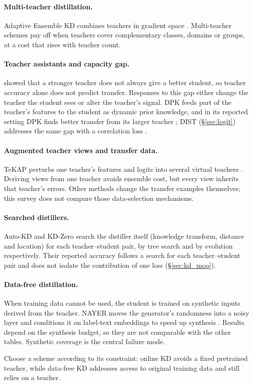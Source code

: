 \paragraph{Multi-teacher distillation.} Adaptive Ensemble KD combines teachers in gradient space \citep{du2020aekd}. Multi-teacher schemes pay off when teachers cover complementary classes, domains or groups, at a cost that rises with teacher count.

\paragraph{Teacher assistants and capacity gap.} \citet{cho2019efficacy} showed that a stronger teacher does not always give a better student, so teacher accuracy alone does not predict transfer. Responses to this gap either change the teacher the student sees or alter the teacher's signal.  DPK feeds part of the teacher's features to the student as dynamic prior knowledge, and in its reported setting DPK finds better transfer from its larger teacher \citep{qiu2023dpk}; DIST (\S\ref{sec:logit}) addresses the same gap with a correlation loss \citep{huang2022dist}.

\paragraph{Augmented teacher views and transfer data.} TeKAP perturbs one teacher's features and logits into several virtual teachers \citep{hossain2025tekap}. Deriving views from one teacher avoids ensemble cost, but every view inherits that teacher's errors. Other methods change the transfer examples themselves; this survey does not compare those data-selection mechanisms.

\paragraph{Searched distillers.} Auto-KD \citep{li2023autokd} and KD-Zero \citep{li2023kdzero} search the distiller itself (knowledge transform, distance and location) for each teacher--student pair, by tree search and by evolution respectively. Their reported accuracy follows a search for each teacher--student pair and does not isolate the contribution of one loss (\S\ref{sec:kd_moo}).

\paragraph{Data-free distillation.} When training data cannot be used, the student is trained on synthetic inputs derived from the teacher. NAYER moves the generator's randomness into a noisy layer and conditions it on label-text embeddings to speed up synthesis \citep{tran2024nayer}. Results depend on the synthesis budget, so they are not comparable with the other tables. Synthetic coverage is the central failure mode.

Choose a scheme according to its constraint: online KD avoids a fixed pretrained teacher, while data-free KD addresses access to original training data and still relies on a teacher.
